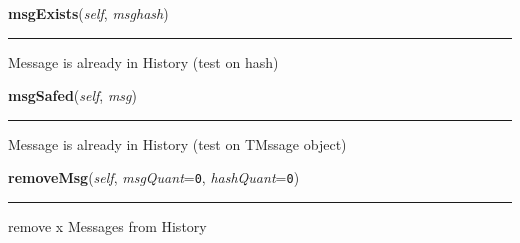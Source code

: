     \label{message:History:msgExists}

    \vspace{0.5ex}

\hspace{.8\funcindent}\begin{boxedminipage}{\funcwidth}

    \raggedright \textbf{msgExists}(\textit{self}, \textit{msghash})

    \vspace{-1.5ex}

    \rule{\textwidth}{0.5\fboxrule}
\setlength{\parskip}{2ex}
    Message is already in History (test on hash)

\setlength{\parskip}{1ex}
    \end{boxedminipage}

    \label{message:History:msgSafed}

    \vspace{0.5ex}

\hspace{.8\funcindent}\begin{boxedminipage}{\funcwidth}

    \raggedright \textbf{msgSafed}(\textit{self}, \textit{msg})

    \vspace{-1.5ex}

    \rule{\textwidth}{0.5\fboxrule}
\setlength{\parskip}{2ex}
    Message is already in History (test on TMssage object)

\setlength{\parskip}{1ex}
    \end{boxedminipage}

    \label{message:History:removeMsg}

    \vspace{0.5ex}

\hspace{.8\funcindent}\begin{boxedminipage}{\funcwidth}

    \raggedright \textbf{removeMsg}(\textit{self}, \textit{msgQuant}={\tt 0}, \textit{hashQuant}={\tt 0})

    \vspace{-1.5ex}

    \rule{\textwidth}{0.5\fboxrule}
\setlength{\parskip}{2ex}
    remove x Messages from History

\setlength{\parskip}{1ex}
    \end{boxedminipage}

